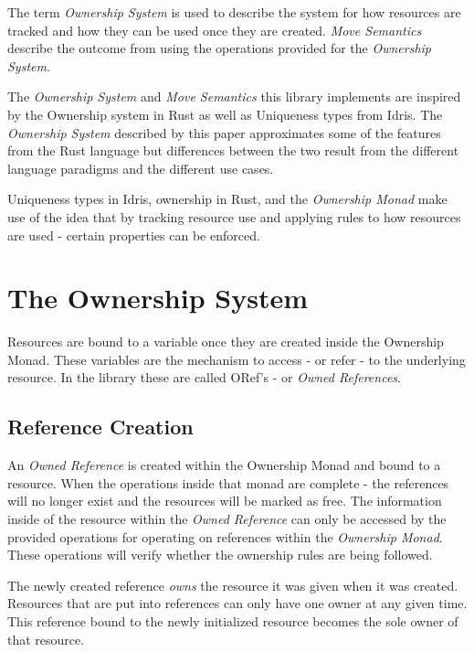 \documentclass[onehalf,11pt]{beavtex}
\begin{document}
The term \textit{Ownership System} is used to describe the system for how
resources are tracked and how they can be used once they are created.
\textit{Move Semantics} describe the outcome from using the operations provided
for the \textit{Ownership System}.

The \textit{Ownership System} and \textit{Move Semantics} this library
implements are inspired by the Ownership system in Rust as well as
Uniqueness types from Idris.\cite{rust_book_ownership} \cite{idris_uniqueness_types}
The \textit{Ownership System} described by this paper approximates some of the
features from the Rust language but differences between the two result from the
different language paradigms and the different use cases.

Uniqueness types in Idris, ownership in Rust, and the \textit{Ownership Monad}
make use of the idea that by tracking resource use and applying rules to how
resources are used - certain properties can be enforced.


\section{The Ownership System}

Resources are bound to a variable once they are created inside the Ownership
Monad.  These variables are the mechanism to access - or refer - to the
underlying resource.  In the library these are called ORef's -
or \textit{Owned References}.

\subsection{Reference Creation}

An \textit{Owned Reference} is created within the Ownership Monad and bound to a
resource. When the operations inside that monad are complete - the references
will no longer exist and the resources will be marked as free.
The information inside of the resource within the \textit{Owned Reference} can
only be accessed by the provided operations for operating on references within
the \textit{Ownership Monad}.  These operations will verify whether the
ownership rules are being followed.

The newly created reference \textit{owns} the resource it was given
when it was created. Resources that are put into references can only have one
owner at any given time. This reference bound to the newly initialized resource
becomes the sole owner of that resource.
\end{document}
